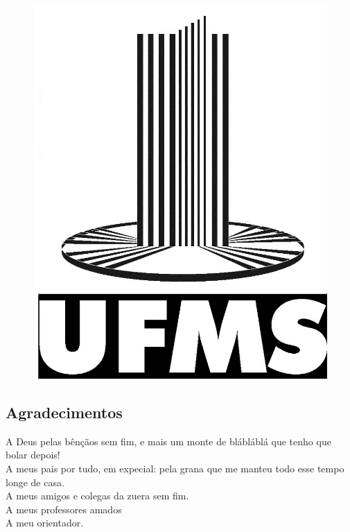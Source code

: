\documentclass[12pt,
				openright,
				twoside,
				a4paper,
				apter=TITLE,
				section=TITLE,
				subsection=TITLE,
				chapter=TITLE,
				english,
				brazil]{abntex2}
\begin{document}



\begin{figure}
\centering
\includegraphics[scale=0.3]{img/logoufms}
\end{figure}
\imprimircapa

\imprimirfolhaderosto
\imprimirtipotrabalho
\imprimirorientador




\begin{flushright}

\begin{minipage}[b]{13cm}
\vspace{15.01cm}
\chapter*{Agradecimentos}{
\calligra A Deus pelas bênçãos sem fim, e mais um monte de blábláblá que tenho que bolar depois!\\
A meus pais por tudo, em expecial: pela grana que me manteu todo esse tempo longe de casa.\\
A meus amigos e colegas da zuera sem fim.\\
A meus professores amados \\
A meu orientador.}

\end{minipage}
\end{flushright}
\end{document}
